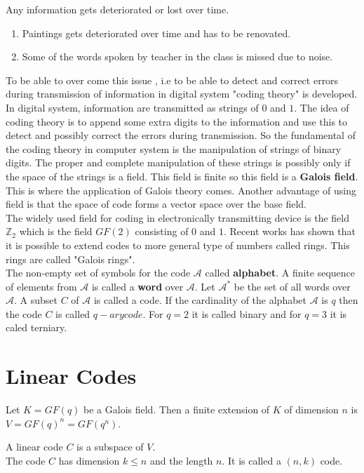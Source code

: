 Any information gets deteriorated or lost over time.

\begin{enumerate}
\item Paintings gets deteriorated over time and has to be renovated.
\item Some of the words spoken by teacher in the class is missed due to noise.
\end{enumerate}

To be able to over come this issue , i.e to be able to detect and correct errors during transmission of information in digital system "coding theory" is developed.
In digital system, information are transmitted as strings of \(0\) and \(1\). The idea of coding theory is to append some extra digits to the information and use this to detect and possibly correct the errors during transmission.
So the fundamental of the coding theory in computer system is the manipulation of strings of binary digits. The proper and complete manipulation of these strings is possibly only if the space of the strings is a field. This field is finite so this field is a \textbf{Galois field}. This is where the application of Galois theory comes.
Another advantage of using field is that the space of code forms a vector space over the base field. \\
The widely used field for coding in electronically transmitting device is the field \({\mathbb{Z}}_2\) which is the field \(GF(2)\) consisting of \(0\) and \(1\). Recent works has shown that it is possible to extend codes to more general type of numbers called rings. This rings are called "Galois rings".\\

The non-empty set of symbols for the code \(\mathcal{A}\) called \textbf{alphabet}. A finite sequence of elements from \(\mathcal{A}\) is called a \textbf{word} over \(\mathcal{A}\). Let \(\mathcal{A}^*\) be the set of all words over \(\mathcal{A}\). A subset \(C\) of \(\mathcal{A}\) is called a code.
If the cardinality of the alphabet \(\mathcal{A}\) is \(q\) then the code \(C\) is called \(q-ary code\). For \(q=2\) it is called binary and for \(q=3\) it is caled terniary.

\section{Linear Codes}
Let \(K=GF(q)\) be a Galois field. Then a finite extension of \(K\) of dimension \(n\) is \(V=GF(q)^n=GF(q^n)\).
\begin{definition}
  A linear code \(C\) is a subspace of \(V\). \\
  The code \(C\) has dimension \(k \leq n\) and the length \(n\). It is called a \((n,k)\) code.
\end{definition}

